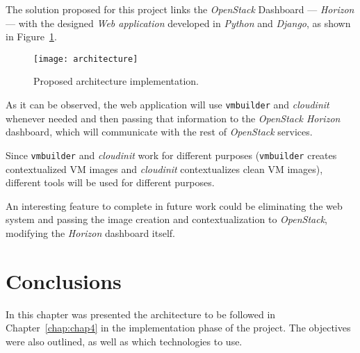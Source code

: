 The solution proposed for this project links the \textit{OpenStack} Dashboard --- \textit{Horizon} --- with the designed \textit{Web application} developed in \textit{Python} and \textit{Django}, as shown in Figure~\ref{fig:architecture}.

\begin{figure}[t]
  \begin{center}
    \leavevmode
    \texttt{[image: architecture]}
    \caption{Proposed architecture implementation.}
    \label{fig:architecture}
  \end{center}
\end{figure}

As it can be observed, the web application will use \texttt{vmbuilder} and \textit{cloudinit} whenever needed and then passing that information to the \textit{OpenStack Horizon} dashboard, which will communicate with the rest of \textit{OpenStack} services.

Since \texttt{vmbuilder} and \textit{cloudinit} work for different purposes (\texttt{vmbuilder} creates contextualized VM images and \textit{cloudinit} contextualizes clean VM images), different tools will be used for different purposes.



An interesting feature to complete in future work could be eliminating the web system and passing the image creation and contextualization to \textit{OpenStack}, modifying the \textit{Horizon} dashboard itself.
 


\section{Conclusions}

In this chapter was presented the architecture to be followed in Chapter~\ref{chap:chap4} in the implementation phase of the project. The objectives were also outlined, as well as which technologies to use.
